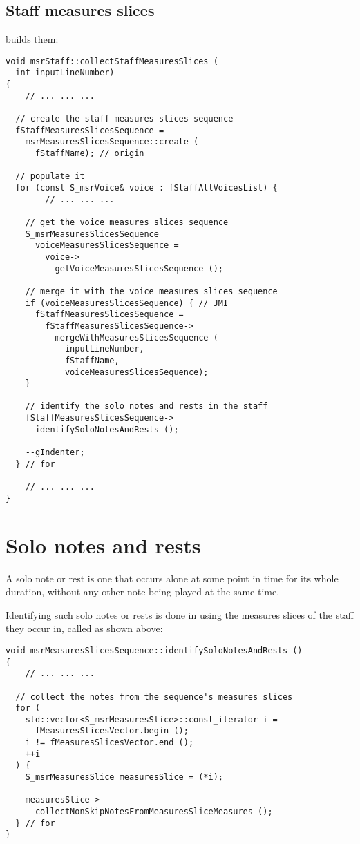 \subsection{Staff measures slices}

 builds them:
\begin{lstlisting}[language=CPlusPlus]
void msrStaff::collectStaffMeasuresSlices (
  int inputLineNumber)
{
	// ... ... ...

  // create the staff measures slices sequence
  fStaffMeasuresSlicesSequence =
    msrMeasuresSlicesSequence::create (
      fStaffName); // origin

  // populate it
  for (const S_msrVoice& voice : fStaffAllVoicesList) {
		// ... ... ...

    // get the voice measures slices sequence
    S_msrMeasuresSlicesSequence
      voiceMeasuresSlicesSequence =
        voice->
          getVoiceMeasuresSlicesSequence ();

    // merge it with the voice measures slices sequence
    if (voiceMeasuresSlicesSequence) { // JMI
      fStaffMeasuresSlicesSequence =
        fStaffMeasuresSlicesSequence->
          mergeWithMeasuresSlicesSequence (
            inputLineNumber,
            fStaffName,
            voiceMeasuresSlicesSequence);
    }

    // identify the solo notes and rests in the staff
    fStaffMeasuresSlicesSequence->
      identifySoloNotesAndRests ();

    --gIndenter;
  } // for

	// ... ... ...
}
\end{lstlisting}


\section{Solo notes and rests}

A solo note or rest is one that occurs alone at some point in time for its whole duration, without any other note being played at the same time.

Identifying such solo notes or rests is done in  using the measures slices of the staff they occur in, called  as shown above:
\begin{lstlisting}[language=CPlusPlus]
void msrMeasuresSlicesSequence::identifySoloNotesAndRests ()
{
	// ... ... ...

  // collect the notes from the sequence's measures slices
  for (
    std::vector<S_msrMeasuresSlice>::const_iterator i =
      fMeasuresSlicesVector.begin ();
    i != fMeasuresSlicesVector.end ();
    ++i
  ) {
    S_msrMeasuresSlice measuresSlice = (*i);

    measuresSlice->
      collectNonSkipNotesFromMeasuresSliceMeasures ();
  } // for
}
\end{lstlisting}


